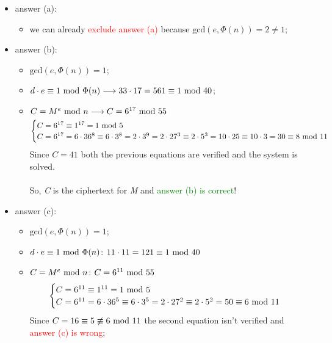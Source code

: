 \begin{itemize}
    \item answer (a):
    \begin{itemize}
        \item we can already \textcolor{red}{exclude answer (a)} because $\text{gcd}(e,\Phi(n))=2\ne1$;
    \end{itemize}
    \item answer (b):
    \begin{itemize}
        \item $\text{gcd}(e,\Phi(n))=1$; \checkmark
        \item $d\cdot e\equiv1\text{ mod }\Phi(n) \longrightarrow 33\cdot17=561\equiv1\text{ mod }40$; \checkmark
        \item $C=M^e\text{ mod } n \longrightarrow C=6^{17}\text{ mod }55$
        \begin{equation*}
            \begin{cases}
                C=6^{17}\equiv1^{17}=1\text{ mod }5\\
                C=6^{17}=6\cdot36^8\equiv6\cdot3^8=2\cdot3^9=2\cdot27^3\equiv2\cdot5^3=10\cdot25\equiv10\cdot3=30\equiv8\text{ mod }11
            \end{cases}
        \end{equation*}
        Since $C=41$ both the previous equations are verified and the system is solved. \checkmark\\\\
        So, \textit{C} is the ciphertext for \textit{M} and \textcolor{Green}{answer (b) is correct}!
    \end{itemize}
    \item answer (c):
    \begin{itemize}
        \item $\text{gcd}(e,\Phi(n))=1$; \checkmark
        \item $d\cdot e\equiv1\text{ mod }\Phi(n)$: $11\cdot11=121\equiv1\text{ mod }40$ \checkmark
        \item $C=M^e\text{ mod } n$: $C=6^{11}\text{ mod }55$
        \begin{equation*}
            \begin{cases}
                C=6^{11}\equiv1^{11}=1\text{ mod }5\\
                C=6^{11}=6\cdot36^5\equiv6\cdot3^5=2\cdot27^2\equiv2\cdot5^2=50\equiv6\text{ mod }11
            \end{cases}
        \end{equation*}
        Since $C=16\equiv5\not\equiv6\text{ mod }11$ the second equation isn't verified and \textcolor{red}{answer (c) is wrong};
    \end{itemize}
\end{itemize}

